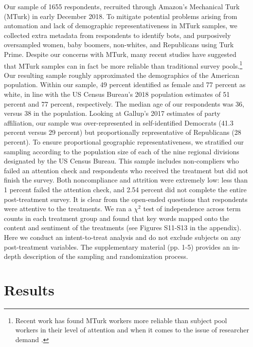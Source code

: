 \documentclass[12pt, letterpaper]{article}
\begin{document}
Our sample of 1655 respondents, recruited through Amazon's Mechanical Turk (MTurk) in early December 2018. To mitigate potential problems arising from automation and lack of demographic representativeness in MTurk samples, we collected extra metadata from respondents to identify bots, and purposively oversampled women, baby boomers, non-whites, and Republicans using Turk Prime. Despite our concerns with MTurk, many recent studies have suggested that MTurk samples can in fact be more reliable than traditional survey pools.\footnote{Recent work has found MTurk workers more reliable than subject pool workers in their level of attention \citep{white_strezhnev_lucas_kruszewska_huff_2018} and when it comes to the issue of researcher demand \citep{Hauser2016}.}  Our resulting sample roughly approximated the demographics of the American population. Within our sample, 49 percent identified as female and 77 percent as white, in line with the US Census Bureau's 2018 population estimates of 51 percent and 77 percent, respectively. The median age of our respondents was 36, versus 38 in the population. Looking at Gallup's 2017 estimates of party affiliation, our sample was over-represented in self-identified Democrats (41.3 percent versus 29 percent) but proportionally representative of Republicans (28 percent). To ensure proportional geographic representativeness, we stratified our sampling according to the population size of each of the nine regional divisions designated by the US Census Bureau. This sample includes non-compliers who failed an attention check and respondents who received the treatment but did not finish the survey. Both noncompliance and attrition were extremely low: less than 1 percent failed the attention check, and 2.54 percent did not complete the entire post-treatment survey. It is clear from the open-ended questions that respondents were attentive to the treatments. We ran a $\chi^2$ test of independence across term counts in each treatment group and found that key words mapped onto the content and sentiment of the treatments (see Figures S11-S13 in the appendix). Here we conduct an intent-to-treat analysis and do not exclude subjects on any post-treatment variables. The supplementary material (pp. 1-5) provides an in-depth description of the sampling and randomization process.

\section{Results}
	
\end{document}
